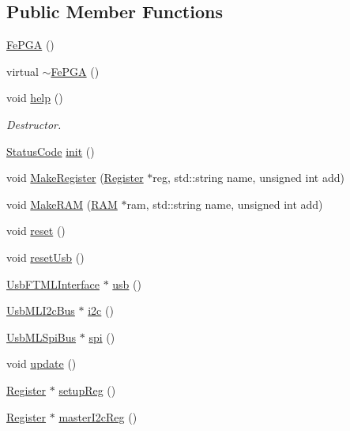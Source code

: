 \subsection*{Public Member Functions}
\begin{DoxyCompactItemize}
\item 
\hyperlink{classFePGA_a377ae8860fbb3162e0c49dd08197a670}{FePGA} ()
\item 
virtual \hyperlink{classFePGA_aa445095a44c521b6b7803feaef6c16ba}{$\sim$FePGA} ()
\item 
void \hyperlink{classFePGA_ae6425fbad1a8db57025efaf387a6f41b}{help} ()
\begin{DoxyCompactList}\small\item\em Destructor. \item\end{DoxyCompactList}\item 
\hyperlink{classStatusCode}{StatusCode} \hyperlink{classFePGA_a5355858b1b8deedcc12acff80f025804}{init} ()
\item 
void \hyperlink{classFePGA_aa58fc0a09d8efa7abc2766bf5bb67327}{MakeRegister} (\hyperlink{classRegister}{Register} $\ast$reg, std::string name, unsigned int add)
\item 
void \hyperlink{classFePGA_ac3af50fbe7f8f7a8c6adbcb164cbbf47}{MakeRAM} (\hyperlink{classRAM}{RAM} $\ast$ram, std::string name, unsigned int add)
\item 
void \hyperlink{classFePGA_abdf7a9dd901351a7eafd748d35172a3c}{reset} ()
\item 
void \hyperlink{classFePGA_a79d95b2fccf4d2ea473e6cf6980d6cf6}{resetUsb} ()
\item 
\hyperlink{classUsbFTMLInterface}{UsbFTMLInterface} $\ast$ \hyperlink{classFePGA_a4a7889dc3c2f88f623876ca475e66410}{usb} ()
\item 
\hyperlink{classUsbMLI2cBus}{UsbMLI2cBus} $\ast$ \hyperlink{classFePGA_a1553db5010cce9e3495aa3060baf0b3c}{i2c} ()
\item 
\hyperlink{classUsbMLSpiBus}{UsbMLSpiBus} $\ast$ \hyperlink{classFePGA_ab54f9f61e87f1cced6c4ba19eb38a848}{spi} ()
\item 
void \hyperlink{classFePGA_ad23605ae261d2aa0562cbb732661b2c4}{update} ()
\item 
\hyperlink{classRegister}{Register} $\ast$ \hyperlink{classFePGA_aa0657c6ef809f3f6b54613f237750cc4}{setupReg} ()
\item 
\hyperlink{classRegister}{Register} $\ast$ \hyperlink{classFePGA_a2bcd2c468fc3e1bcadc9bd8800b325a0}{masterI2cReg} ()
\item 

\end{DoxyCompactItemize}
